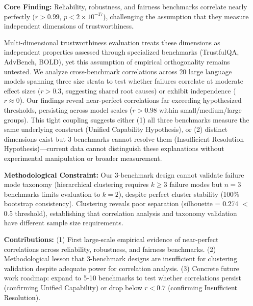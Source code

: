 \textbf{Core Finding:} Reliability, robustness, and fairness benchmarks correlate nearly perfectly ($r > 0.99$, $p < 2\times10^{-17}$), challenging the assumption that they measure independent dimensions of trustworthiness.

Multi-dimensional trustworthiness evaluation treats these dimensions as independent properties assessed through specialized benchmarks (TrustfulQA, AdvBench, BOLD), yet this assumption of empirical orthogonality remains untested. We analyze cross-benchmark correlations across 20 large language models spanning three size strata to test whether failures correlate at moderate effect sizes ($r > 0.3$, suggesting shared root causes) or exhibit independence ($r \approx 0$). Our findings reveal near-perfect correlations far exceeding hypothesized thresholds, persisting across model scales ($r > 0.98$ within small/medium/large groups). This tight coupling suggests either (1) all three benchmarks measure the same underlying construct (Unified Capability Hypothesis), or (2) distinct dimensions exist but 3 benchmarks cannot resolve them (Insufficient Resolution Hypothesis)---current data cannot distinguish these explanations without experimental manipulation or broader measurement.

\textbf{Methodological Constraint:} Our 3-benchmark design cannot validate failure mode taxonomy (hierarchical clustering requires $k\geq3$ failure modes but $n=3$ benchmarks limits evaluation to $k=2$), despite perfect cluster stability (100\% bootstrap consistency). Clustering reveals poor separation (silhouette = 0.274 $<$ 0.5 threshold), establishing that correlation analysis and taxonomy validation have different sample size requirements.

\textbf{Contributions:} (1) First large-scale empirical evidence of near-perfect correlations across reliability, robustness, and fairness benchmarks. (2) Methodological lesson that 3-benchmark designs are insufficient for clustering validation despite adequate power for correlation analysis. (3) Concrete future work roadmap: expand to 5-10 benchmarks to test whether correlations persist (confirming Unified Capability) or drop below $r < 0.7$ (confirming Insufficient Resolution).
